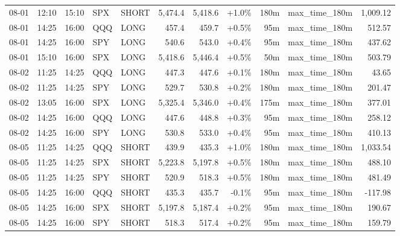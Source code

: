 \documentclass[11pt,a4paper,twoside]{article}
\begin{document}
\begin{center}
\begin{longtable}{>{\color{txtmain}}l l l l l r r r r >{\color{txtmain}}l r}
08-01 & 12:10 & 15:10 & SPX & SHORT & 5,474.4 & 5,418.6 & \textcolor{wingreen}{+1.0\%} & 180m & max\_time\_180m & \textcolor{wingreen}{1,009.12} \\
08-01 & 14:25 & 16:00 & QQQ & LONG & 457.4 & 459.7 & \textcolor{wingreen}{+0.5\%} & 95m & max\_time\_180m & \textcolor{wingreen}{512.57} \\
08-01 & 14:25 & 16:00 & SPY & LONG & 540.6 & 543.0 & \textcolor{wingreen}{+0.4\%} & 95m & max\_time\_180m & \textcolor{wingreen}{437.62} \\
08-01 & 15:10 & 16:00 & SPX & LONG & 5,418.6 & 5,446.4 & \textcolor{wingreen}{+0.5\%} & 50m & max\_time\_180m & \textcolor{wingreen}{503.79} \\
08-02 & 11:25 & 14:25 & QQQ & LONG & 447.3 & 447.6 & \textcolor{wingreen}{+0.1\%} & 180m & max\_time\_180m & \textcolor{wingreen}{43.65} \\
08-02 & 11:25 & 14:25 & SPY & LONG & 529.7 & 530.8 & \textcolor{wingreen}{+0.2\%} & 180m & max\_time\_180m & \textcolor{wingreen}{201.47} \\
08-02 & 13:05 & 16:00 & SPX & LONG & 5,325.4 & 5,346.0 & \textcolor{wingreen}{+0.4\%} & 175m & max\_time\_180m & \textcolor{wingreen}{377.01} \\
08-02 & 14:25 & 16:00 & QQQ & LONG & 447.6 & 448.8 & \textcolor{wingreen}{+0.3\%} & 95m & max\_time\_180m & \textcolor{wingreen}{258.12} \\
08-02 & 14:25 & 16:00 & SPY & LONG & 530.8 & 533.0 & \textcolor{wingreen}{+0.4\%} & 95m & max\_time\_180m & \textcolor{wingreen}{410.13} \\
08-05 & 11:25 & 14:25 & QQQ & SHORT & 439.9 & 435.3 & \textcolor{wingreen}{+1.0\%} & 180m & max\_time\_180m & \textcolor{wingreen}{1,033.54} \\
08-05 & 11:25 & 14:25 & SPX & SHORT & 5,223.8 & 5,197.8 & \textcolor{wingreen}{+0.5\%} & 180m & max\_time\_180m & \textcolor{wingreen}{488.10} \\
08-05 & 11:25 & 14:25 & SPY & SHORT & 520.9 & 518.3 & \textcolor{wingreen}{+0.5\%} & 180m & max\_time\_180m & \textcolor{wingreen}{481.49} \\
08-05 & 14:25 & 16:00 & QQQ & SHORT & 435.3 & 435.7 & \textcolor{lossred}{-0.1\%} & 95m & max\_time\_180m & \textcolor{lossred}{-117.98} \\
08-05 & 14:25 & 16:00 & SPX & SHORT & 5,197.8 & 5,187.4 & \textcolor{wingreen}{+0.2\%} & 95m & max\_time\_180m & \textcolor{wingreen}{190.67} \\
08-05 & 14:25 & 16:00 & SPY & SHORT & 518.3 & 517.4 & \textcolor{wingreen}{+0.2\%} & 95m & max\_time\_180m & \textcolor{wingreen}{159.79} \\

\end{longtable}
\end{center}
\end{document}
